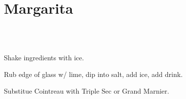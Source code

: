 \section[Margarita]{Margarita~\vegan}


\begin{recipestats}[
	servings=1,
	preptime=5 \minute,
]
\end{recipestats}


\begin{ingredientcolumns}[1]
	\begin{ingredientblock}
		\\
		\\
	\end{ingredientblock}
\end{ingredientcolumns}


\begin{preparation}
\item Shake ingredients with ice.
\item Rub edge of glass w/ lime, dip into salt, add ice, add drink.
\end{preparation}


\begin{variation}
\item Substitue Cointreau with Triple Sec or Grand Marnier.
\end{variation}

\recipeend
